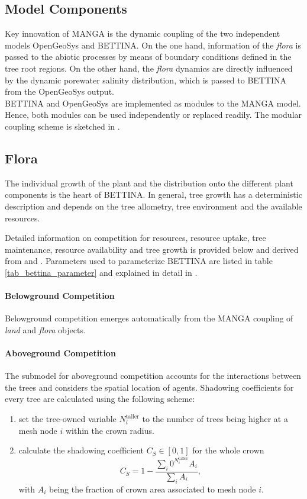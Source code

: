 \documentclass[manusscript, 12p, authoryear]{elsarticle}
\begin{document}
\subsection{Model Components}
Key innovation of MANGA is the dynamic coupling of the two independent models OpenGeoSys and BETTINA.
On the one hand, information of the \textit{flora} is passed to the abiotic processes by means of boundary conditions defined in the tree root regions.
On the other hand, the \textit{flora} dynamics are directly influenced by the dynamic porewater salinity distribution, which is passed to BETTINA from the OpenGeoSys output.\\
BETTINA and OpenGeoSys are implemented as modules to the MANGA model.
Hence, both modules can be used independently or replaced readily.
The modular coupling scheme is sketched in \citet{Bathmann2020}.

\subsection{Flora}
The individual growth of the plant and the distribution onto the different plant components is the heart of BETTINA.
In general, tree growth has a deterministic description and depends on the tree allometry, tree environment and the available resources.

Detailed information on competition for resources, resource uptake, tree maintenance, resource availability and tree growth is provided below and derived from \citet{Ronny2014} and \citet{Peters2018}.
Parameters used to parameterize BETTINA are listed in table \ref{tab_bettina_parameter} and explained in detail in \citet{Ronny2014}.
\paragraph{\textbf{Belowground Competition}}
Belowground competition emerges automatically from the MANGA coupling of \textit{land} and \textit{flora} objects.
\paragraph{\textbf{Aboveground Competition}}
The submodel for aboveground competition accounts for the interactions between the trees and considers the spatial location of agents.
Shadowing coefficients for every tree are calculated using the following scheme:
\begin{enumerate}
\item set the tree-owned variable $N^{\text{taller}}_i$ to the number of trees being higher at a mesh node $i$ within the crown radius.
\item calculate the shadowing coefficient $C_S\in [0,1]$ for the whole crown
\begin{equation}
C_S = 1-\frac{\sum_i 0^{N^{\text{taller}}_i} A_i}{\sum_i A_i},
\end{equation}
with $A_i$ being the fraction of crown area associated to mesh node $i$.
\end{enumerate}
\end{document}
